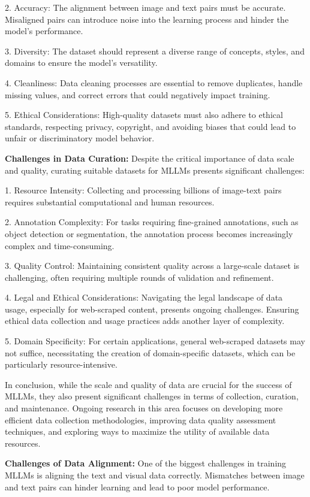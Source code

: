 2. Accuracy: The alignment between image and text pairs must be accurate. Misaligned pairs can introduce noise into the learning process and hinder the model's performance.

3. Diversity: The dataset should represent a diverse range of concepts, styles, and domains to ensure the model's versatility.

4. Cleanliness: Data cleaning processes are essential to remove duplicates, handle missing values, and correct errors that could negatively impact training.

5. Ethical Considerations: High-quality datasets must also adhere to ethical standards, respecting privacy, copyright, and avoiding biases that could lead to unfair or discriminatory model behavior.

\textbf{Challenges in Data Curation:} Despite the critical importance of data scale and quality, curating suitable datasets for MLLMs presents significant challenges:

1. Resource Intensity: Collecting and processing billions of image-text pairs requires substantial computational and human resources.

2. Annotation Complexity: For tasks requiring fine-grained annotations, such as object detection or segmentation, the annotation process becomes increasingly complex and time-consuming.

3. Quality Control: Maintaining consistent quality across a large-scale dataset is challenging, often requiring multiple rounds of validation and refinement.

4. Legal and Ethical Considerations: Navigating the legal landscape of data usage, especially for web-scraped content, presents ongoing challenges. Ensuring ethical data collection and usage practices adds another layer of complexity.

5. Domain Specificity: For certain applications, general web-scraped datasets may not suffice, necessitating the creation of domain-specific datasets, which can be particularly resource-intensive.

In conclusion, while the scale and quality of data are crucial for the success of MLLMs, they also present significant challenges in terms of collection, curation, and maintenance. Ongoing research in this area focuses on developing more efficient data collection methodologies, improving data quality assessment techniques, and exploring ways to maximize the utility of available data resources.

\textbf{Challenges of Data Alignment:} One of the biggest challenges in training MLLMs is aligning the text and visual data correctly. Mismatches between image and text pairs can hinder learning and lead to poor model performance.

